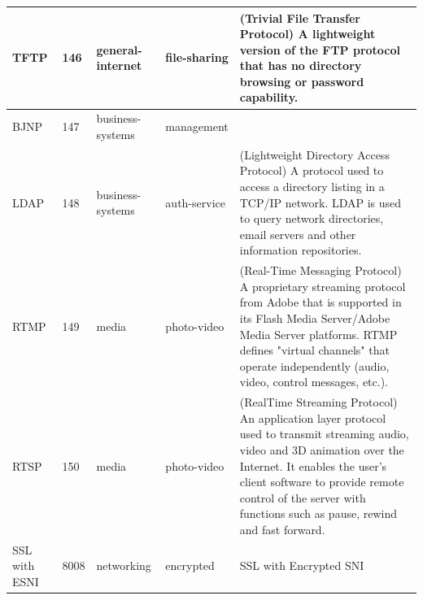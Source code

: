 \begin{longtable}{p{}|p{}|p{}|p{}|p{}}
    TFTP &	146 &	general-internet &	file-sharing &	(Trivial File Transfer Protocol) A lightweight version of the FTP protocol that has no directory browsing or password capability.\\ \hline	
    BJNP &	147 &	business-systems &	management &	\\ \hline	
    LDAP &	148 &	business-systems &	auth-service &	(Lightweight Directory Access Protocol) A protocol used to access a directory listing in a TCP/IP network. LDAP is used to query network directories, email servers and other information repositories. \\ \hline	
    RTMP &	149 &	media &	photo-video &	(Real-Time Messaging Protocol) A proprietary streaming protocol from Adobe that is supported in its Flash Media Server/Adobe Media Server platforms. RTMP defines "virtual channels" that operate independently (audio, video, control messages, etc.).\\ \hline	
    RTSP &	150 &	media &	photo-video &	(RealTime Streaming Protocol) An application layer protocol used to transmit streaming audio, video and 3D animation over the Internet. It enables the user's client software to provide remote control of the server with functions such as pause, rewind and fast forward.\\ \hline	    
    SSL with ESNI &	8008 &	networking &	encrypted &	SSL with Encrypted SNI \\ \hline
\end{longtable}

